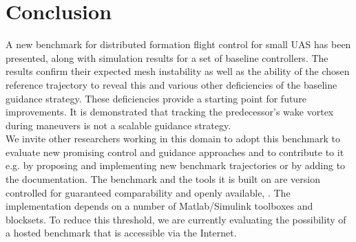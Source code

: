 \documentclass{ifacconf}
\begin{document}
\section{Conclusion}
\label{sec:conclusio}
A new benchmark for distributed formation flight control for small UAS has been presented, along with simulation results for a set of baseline controllers. The results confirm their expected mesh instability as well as the ability of the chosen reference trajectory to reveal this and various other deficiencies of the baseline guidance strategy. These deficiencies provide a starting point for future improvements. It is demonstrated that tracking the predecessor's wake vortex during maneuvers is not a scalable guidance strategy. \\
We invite other researchers working in this domain to adopt this benchmark to evaluate new promising control and guidance approaches and to contribute to it e.g. by proposing and implementing new benchmark trajectories or by adding to the documentation. The benchmark and the tools it is built on are version controlled for guaranteed comparability and openly available, \cite{UAV3D,uavsimblockset,ffb,STRAGE}. The implementation depends on a number of Matlab/Simulink toolboxes and blocksets. To reduce this threshold, we are currently evaluating the possibility of a hosted benchmark that is accessible via the Internet.

      
\end{document}

